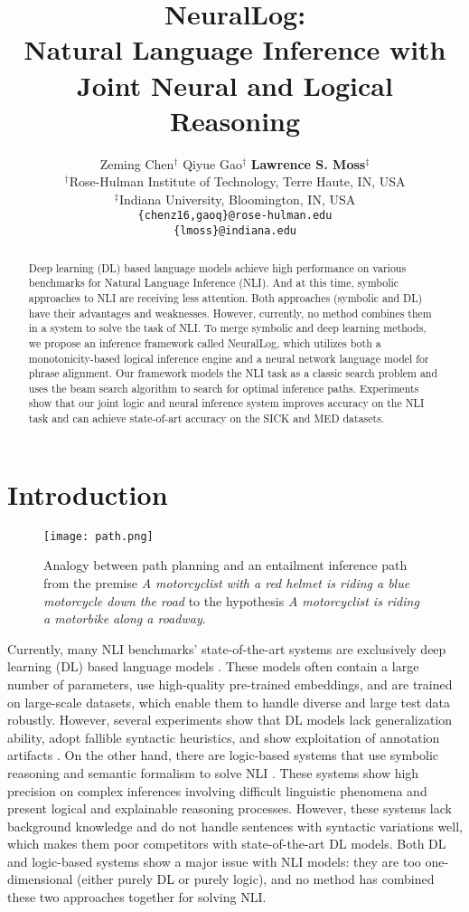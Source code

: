 \documentclass[11pt,a4paper]{article}
\title{NeuralLog: \\Natural Language Inference with Joint Neural and Logical Reasoning}
\author{
{Zeming Chen$^{\dagger}$\footnotemark} \quad
  Qiyue Gao$^{\dagger}$ \quad
  \textbf{Lawrence S. Moss}$^\ddagger$ \\
$^\dagger$Rose-Hulman Institute of Technology, Terre Haute, IN, USA\\
$^\ddagger$Indiana University, Bloomington, IN, USA\\
{\tt{\{chenz16,gaoq\}@rose-hulman.edu}} \\
{\tt \{lmoss\}@indiana.edu}
}
\date{}
\begin{document}
\maketitle
{}
\begin{abstract}
Deep learning (DL) based language models achieve high performance on various benchmarks for Natural Language Inference (NLI). And at this time, symbolic approaches to NLI are receiving less attention. Both approaches (symbolic and DL) have their advantages and weaknesses. However, currently, no method combines them in a system to solve the task of NLI. To merge symbolic and deep learning methods, we propose an inference framework called NeuralLog, which utilizes both a monotonicity-based logical inference engine and a neural network language model for phrase alignment. Our framework models the NLI task as a classic search problem and uses the beam search algorithm to search for optimal inference paths. Experiments show that our joint logic and neural inference system improves accuracy on the NLI task and can achieve state-of-art accuracy on the SICK and MED datasets.  \end{abstract}

\section{Introduction}
 \begin{figure}[t!]
    \centering
    \texttt{[image: path.png]}
    \caption{Analogy between path planning and an entailment inference path from the premise \textit{A motorcyclist with a red helmet is riding a blue motorcycle down the road} to the hypothesis \textit{A motorcyclist is riding a motorbike along a roadway}.}
    \label{fig:proof_path}
\end{figure}
Currently, many NLI benchmarks’ state-of-the-art systems are exclusively deep learning (DL) based language models \cite{devlin-etal-2019-bert, Lan2020ALBERT:, liu2020roberta, yin-schutze-2017-task}. These models often contain a large number of parameters, use high-quality pre-trained embeddings, and are trained on large-scale datasets, which enable them to handle diverse and large test data robustly. However,  several experiments show that DL models lack generalization ability, adopt fallible syntactic heuristics, and show exploitation of annotation artifacts \cite{glockner-etal-2018-breaking, mccoy-etal-2019-right, gururangan-etal-2018-annotation}. On the other hand, there are logic-based systems that use symbolic reasoning and semantic formalism to solve NLI \cite{abzianidze-2017-langpro, martinez-gomez-etal-2017-demand, yanaka-etal-2018-acquisition, hu-etal-2020-monalog}. These systems show high precision on complex inferences involving difficult linguistic phenomena and present logical and explainable reasoning processes. However, these systems lack background knowledge and do not handle sentences with syntactic variations well, which makes them poor competitors with state-of-the-art DL models. Both DL and logic-based systems show a major issue with NLI models: they are too one-dimensional (either purely DL or purely logic), and no method has combined these two approaches together for solving NLI. 
\end{document}
